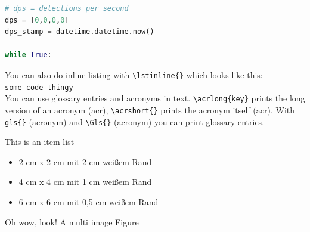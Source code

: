 \documentclass{../Main/main.tex}{subfiles}
\begin{document}
\begin{lstlisting}[language=Python,caption=DPS variable Instantiations,firstnumber=58]
# dps = detections per second
dps = [0,0,0,0]
dps_stamp = datetime.datetime.now()

while True:\end{lstlisting}

You can also do inline listing with \verb!\lstinline{}! which looks like this:\\
\lstinline{some code thingy}\\

You can use glossary entries and acronyms in text. \verb!\acrlong{key}! prints the long
version of an acronym (\acrlong{acr}), \verb!\acrshort{}! prints the acronym itself (\acrshort{acr}).
With \verb!gls{}! (\gls{acronym}) and \verb!\Gls{}! (\Gls{acronym}) you can print glossary entries.

This is an item list

\begin{itemize}
    \item 2 cm x 2 cm mit 2 cm weißem Rand
    \item 4 cm x 4 cm mit 1 cm weißem Rand
    \item 6 cm x 6 cm mit 0,5 cm weißem Rand
\end{itemize}

Oh wow, look! A multi image Figure

\begin{figure}[H]
    \centering
\end{figure}
\end{document}
